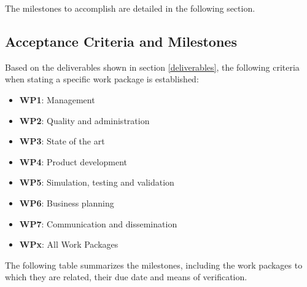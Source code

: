 The milestones to accomplish are detailed in the following section.    

\subsection{Acceptance Criteria and Milestones}


Based on the deliverables shown in section \ref{deliverables}, the following criteria when stating a specific work package is established:
\begin{itemize} 	
	\item \textbf{WP1}: Management 
	\item \textbf{WP2}: Quality and administration
	\item \textbf{WP3}: State of the art
	\item \textbf{WP4}: Product development
	\item \textbf{WP5}: Simulation, testing and validation
	\item \textbf{WP6}: Business planning
	\item \textbf{WP7}: Communication and dissemination
	\item \textbf{WPx}: All Work Packages
\end{itemize}

The following table summarizes the milestones, including the work packages to which they are related, their due date and means of verification.

